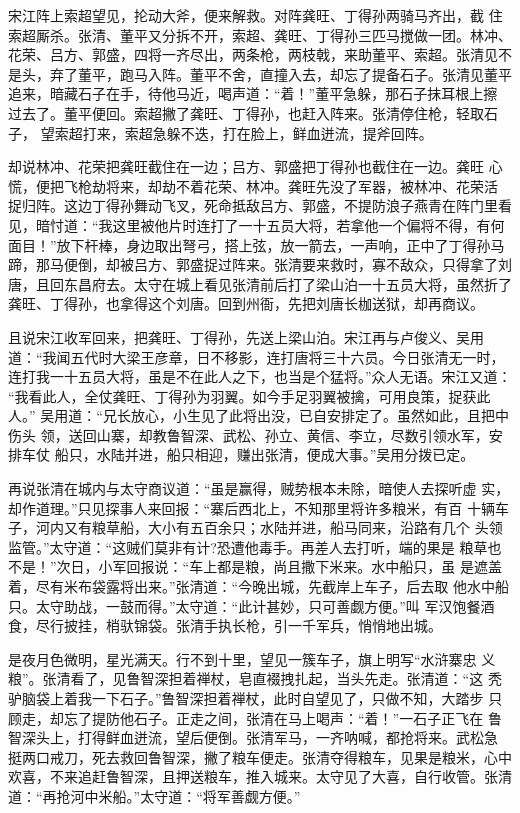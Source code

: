 宋江阵上索超望见，抡动大斧，便来解救。对阵龚旺、丁得孙两骑马齐出，截
住索超厮杀。张清、董平又分拆不开，索超、龚旺、丁得孙三匹马搅做一团。林冲、
花荣、吕方、郭盛，四将一齐尽出，两条枪，两枝戟，来助董平、索超。张清见不
是头，弃了董平，跑马入阵。董平不舍，直撞入去，却忘了提备石子。张清见董平
追来，暗藏石子在手，待他马近，喝声道：“着！”董平急躲，那石子抹耳根上擦
过去了。董平便回。索超撇了龚旺、丁得孙，也赶入阵来。张清停住枪，轻取石子，
望索超打来，索超急躲不迭，打在脸上，鲜血迸流，提斧回阵。

却说林冲、花荣把龚旺截住在一边；吕方、郭盛把丁得孙也截住在一边。龚旺
心慌，便把飞枪劫将来，却劫不着花荣、林冲。龚旺先没了军器，被林冲、花荣活
捉归阵。这边丁得孙舞动飞叉，死命抵敌吕方、郭盛，不提防浪子燕青在阵门里看
见，暗忖道：“我这里被他片时连打了一十五员大将，若拿他一个偏将不得，有何
面目！”放下杆棒，身边取出弩弓，搭上弦，放一箭去，一声响，正中了丁得孙马
蹄，那马便倒，却被吕方、郭盛捉过阵来。张清要来救时，寡不敌众，只得拿了刘
唐，且回东昌府去。太守在城上看见张清前后打了梁山泊一十五员大将，虽然折了
龚旺、丁得孙，也拿得这个刘唐。回到州衙，先把刘唐长枷送狱，却再商议。

且说宋江收军回来，把龚旺、丁得孙，先送上梁山泊。宋江再与卢俊义、吴用
道：“我闻五代时大梁王彦章，日不移影，连打唐将三十六员。今日张清无一时，
连打我一十五员大将，虽是不在此人之下，也当是个猛将。”众人无语。宋江又道：
“我看此人，全仗龚旺、丁得孙为羽翼。如今手足羽翼被擒，可用良策，捉获此人。”
吴用道：“兄长放心，小生见了此将出没，已自安排定了。虽然如此，且把中伤头
领，送回山寨，却教鲁智深、武松、孙立、黄信、李立，尽数引领水军，安排车仗
船只，水陆并进，船只相迎，赚出张清，便成大事。”吴用分拨已定。

再说张清在城内与太守商议道：“虽是赢得，贼势根本未除，暗使人去探听虚
实，却作道理。”只见探事人来回报：“寨后西北上，不知那里将许多粮米，有百
十辆车子，河内又有粮草船，大小有五百余只；水陆并进，船马同来，沿路有几个
头领监管。”太守道：“这贼们莫非有计?恐遭他毒手。再差人去打听，端的果是
粮草也不是！”次日，小军回报说：“车上都是粮，尚且撒下米来。水中船只，虽
是遮盖着，尽有米布袋露将出来。”张清道：“今晚出城，先截岸上车子，后去取
他水中船只。太守助战，一鼓而得。”太守道：“此计甚妙，只可善觑方便。”叫
军汉饱餐酒食，尽行披挂，梢驮锦袋。张清手执长枪，引一千军兵，悄悄地出城。

是夜月色微明，星光满天。行不到十里，望见一簇车子，旗上明写“水浒寨忠
义粮”。张清看了，见鲁智深担着禅杖，皂直裰拽扎起，当头先走。张清道：“这
秃驴脑袋上着我一下石子。”鲁智深担着禅杖，此时自望见了，只做不知，大踏步
只顾走，却忘了提防他石子。正走之间，张清在马上喝声：“着！”一石子正飞在
鲁智深头上，打得鲜血迸流，望后便倒。张清军马，一齐呐喊，都抢将来。武松急
挺两口戒刀，死去救回鲁智深，撇了粮车便走。张清夺得粮车，见果是粮米，心中
欢喜，不来追赶鲁智深，且押送粮车，推入城来。太守见了大喜，自行收管。张清
道：“再抢河中米船。”太守道：“将军善觑方便。”

